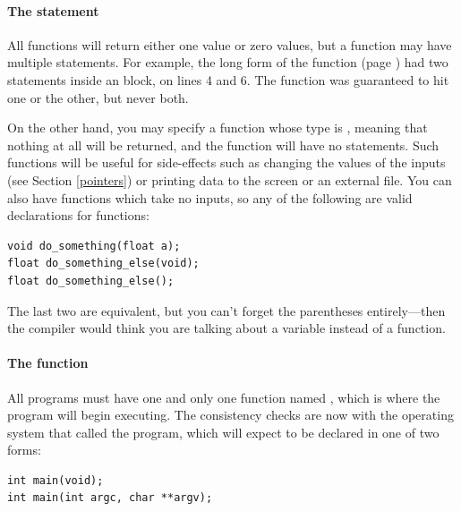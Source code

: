 \paragraph{\treesymbol{} The  statement} 
All functions will return
either one value or zero values, but a function may have
multiple  statements. For example, the long form of the
 function (page \pageref{isevenfn}) had two  statements inside
an  block, on lines 4 and 6. The function was guaranteed
to hit one or the other, but never both.

On the other hand,  you may specify a function whose type is ,
meaning that nothing at all will be returned, and the function will
have no  statements. Such functions will be useful for
side-effects such as changing the values of the inputs (see Section
\ref{pointers}) or printing data to the screen or an external file. You
can also have functions which take no inputs, so any of the following
are valid declarations for functions:

\begin{lstlisting}
void do_something(float a);
float do_something_else(void);
float do_something_else();
\end{lstlisting}

The last two are equivalent, but you can't forget the parentheses
entirely---then the compiler would think you are talking about a variable
instead of a function.


\paragraph{\treesymbol{} The  function}
All programs must have one and only one function named ,
which is where the program will begin executing. The consistency checks
are now with the operating system that called the program, which will
expect  to be declared in one of two forms:

\begin{lstlisting}
int main(void);
int main(int argc, char **argv);
\end{lstlisting}

